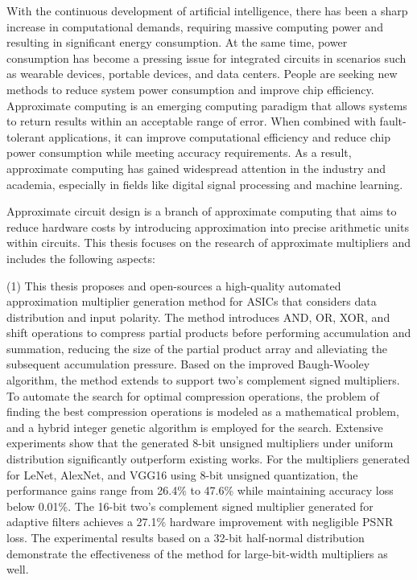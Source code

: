 \begin{abstract*}
      With the continuous development of artificial intelligence, there has been a sharp increase in computational demands, requiring massive computing power and resulting in significant energy consumption. At the same time, power consumption has become a pressing issue for integrated circuits in scenarios such as wearable devices, portable devices, and data centers. People are seeking new methods to reduce system power consumption and improve chip efficiency.
      Approximate computing is an emerging computing paradigm that allows systems to return results within an acceptable range of error. When combined with fault-tolerant applications, it can improve computational efficiency and reduce chip power consumption while meeting accuracy requirements. As a result, approximate computing has gained widespread attention in the industry and academia, especially in fields like digital signal processing and machine learning.
    
      Approximate circuit design is a branch of approximate computing that aims to reduce hardware costs by introducing approximation into precise arithmetic units within circuits. This thesis focuses on the research of approximate multipliers and includes the following aspects:
    
      (1) This thesis proposes and open-sources a high-quality automated approximation multiplier generation method for ASICs that considers data distribution and input polarity. The method introduces AND, OR, XOR, and shift operations to compress partial products before performing accumulation and summation, reducing the size of the partial product array and alleviating the subsequent accumulation pressure. Based on the improved Baugh-Wooley algorithm, the method extends to support two's complement signed multipliers. To automate the search for optimal compression operations, the problem of finding the best compression operations is modeled as a mathematical problem, and a hybrid integer genetic algorithm is employed for the search. Extensive experiments show that the generated 8-bit unsigned multipliers under uniform distribution significantly outperform existing works. For the multipliers generated for LeNet, AlexNet, and VGG16 using 8-bit unsigned quantization, the performance gains range from 26.4\% to 47.6\% while maintaining accuracy loss below 0.01\%. The 16-bit two's complement signed multiplier generated for adaptive filters achieves a 27.1\% hardware improvement with negligible PSNR loss. The experimental results based on a 32-bit half-normal distribution demonstrate the effectiveness of the method for large-bit-width multipliers as well.
    

\end{abstract*}
